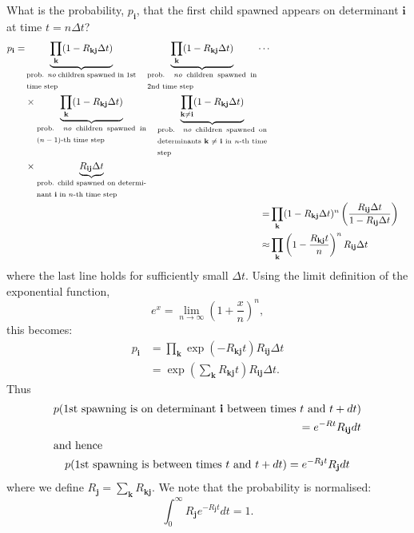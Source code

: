\documentclass[a4paper, 11pt]{article}
\newcommand{\bi}{\mathbf{i}}
\newcommand{\bj}{\mathbf{j}}
\newcommand{\bk}{\mathbf{k}}
\begin{document}
What is the probability, $p_\bi$, that the first child spawned appears on determinant $\bi$ at time $t=n\Delta t$?
\begin{align}
\begin{split}
p_\bi =& 
\underbrace{\prod_{\bk} (1-R_{\bk\bj}\Delta t)}_{\textrm{\parbox{4cm}{prob. \emph{no} children spawned in 1st time step}}}
\quad\underbrace{\prod_{\bk} (1-R_{\bk\bj}\Delta t)}_{\textrm{\parbox{4cm}{prob. \emph{no} children spawned in 2nd time step}}}
\cdots \\
& \times \underbrace{\prod_{\bk} (1-R_{\bk\bj}\Delta t)}_{\textrm{\parbox{4cm}{prob. \emph{no} children spawned in $(n-1)$-th time step}}} 
\quad\underbrace{\prod_{\bk\neq\bi} (1-R_{\bk\bj}\Delta t)}_{\textrm{\parbox{4cm}{prob. \emph{no} children spawned on determinants $\bk\neq\bi$ in $n$-th time step}}} \\
& \times \underbrace{R_{\bi\bj}\Delta t}_{\textrm{\parbox{4cm}{prob. child spawned on determinant $\bi$ in $n$-th time step}}}
\end{split} \\
\hphantom{p}=& \prod_{\bk} (1-R_{\bk\bj}\Delta t)^n \left(\frac{R_{\bi\bj}\Delta t}{1-R_{\bi\bj}\Delta t}\right) \\
\hphantom{p}\approx& \prod_{\bk} \left(1-\frac{R_{\bk\bj}t}{n}\right)^n R_{\bi\bj}\Delta t
\end{align}
where the last line holds for sufficiently small $\Delta t$.  Using the limit definition of the exponential function, 
\begin{equation}
e^x = \lim_{n\to\infty} \left(1+\frac{x}{n}\right)^n,
\end{equation}
this becomes:
\begin{align}
p_\bi &= \prod_{\bk} \exp\left(-R_{\bk\bj}t\right) R_{\bi\bj}\Delta t \\
  &= \exp\left(\sum_\bk R_{\bk\bj}t\right)  R_{\bi\bj}\Delta t.
\end{align}
Thus
\begin{gather}
\begin{split}
p(\textrm{1st spawning is on determinant $\bi$ between times $t$ and $t+dt$}) \\ \quad = e^{-Rt} R_{\bi\bj} dt
\end{split} \\ 
\intertext{and hence}
p(\textrm{1st spawning is between times $t$ and $t+dt$}) = e^{-R_\bj t} R_\bj dt
\end{gather}
where we define $R_\bj=\sum_\bk R_{\bk\bj}$.  We note that the probability is normalised:
\begin{equation}
\int_0^\infty R_\bj e^{-R_\bj t} dt = 1.
\end{equation}
\end{document}
